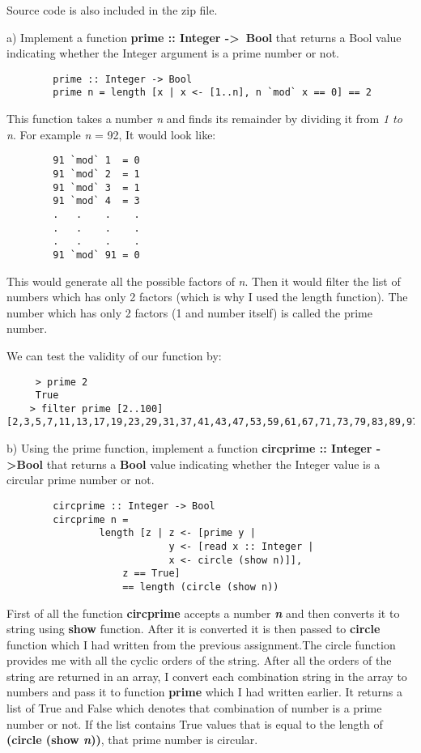 \documentclass[a4paper,12pt]{article}
\begin{document}
    \begin{center}
        Source code is also included in the zip file.
    \end{center}

    a) Implement a function \textbf{prime :: Integer -\textgreater\ Bool} that returns a Bool value indicating whether the Integer argument is a prime number or not.

    \begin{verbatim}
        prime :: Integer -> Bool
        prime n = length [x | x <- [1..n], n `mod` x == 0] == 2
    \end{verbatim}

    This function takes a number \textit{n} and finds its remainder by dividing it from \textit{1 to n}. For example \textit{n} = 92, It would look like:


    \begin{verbatim}
        91 `mod` 1  = 0
        91 `mod` 2  = 1
        91 `mod` 3  = 1
        91 `mod` 4  = 3
        .   .    .    .
        .   .    .    .
        .   .    .    .
        91 `mod` 91 = 0
    \end{verbatim}

    This would generate all the possible factors of \textit{n}. Then it would filter the list of numbers which has only 2 factors (which is why I used the length function). The number which has only 2 factors (1 and number itself) is called the prime number.

    We can test the validity of our function by:
    \begin{verbatim}
     > prime 2
     True
    > filter prime [2..100]
[2,3,5,7,11,13,17,19,23,29,31,37,41,43,47,53,59,61,67,71,73,79,83,89,97]
    \end{verbatim}

    b) Using the prime function, implement a function \textbf{circprime :: Integer -\textgreater Bool} that returns
    a \textbf{Bool} value indicating whether the Integer value is a circular prime number or not.

    \begin{verbatim}
        circprime :: Integer -> Bool
        circprime n =
                length [z | z <- [prime y |
                            y <- [read x :: Integer |
                            x <- circle (show n)]],
                    z == True]
                    == length (circle (show n))
    \end{verbatim}

    First of all the function \textbf{circprime} accepts a number \textbf{\textit{n}} and then converts it to string using \textbf{show} function. After it is converted it is then passed to \textbf{circle} function which I had written from the previous assignment.The circle function provides me with all the cyclic orders of the string. After all the orders of the string are returned in an array, I convert each combination string in the array to numbers and pass it to function \textbf{prime} which I had written earlier. It returns a list of True and False which denotes that combination of number is a prime number or not. If the list contains True values that is equal to the length of \textbf{(circle (show \textit{n}))}, that prime number is circular.
\end{document}
